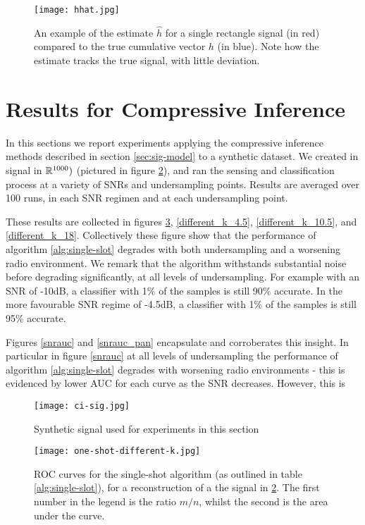 \begin{figure}[h]
\centering
\texttt{[image: hhat.jpg]}
\label{fig:hhat}
\caption{An example of the estimate \(\hat{h}\) for a single rectangle signal (in red) compared to the true cumulative vector \(h\) (in blue). Note how the estimate tracks the true signal, with little deviation.}
\end{figure}

\clearpage

\section{Results for Compressive Inference}
\label{ci-results}

In this sections we report experiments applying the compressive inference methods described in section \ref{sec:sig-model} to a synthetic dataset. We created in signal in \({\mathbb{R}}^{1000})\) (pictured in figure \ref{ci-sig}), and ran the sensing and classification process at a variety of SNRs and undersampling points. Results are averaged over 100 runs, in each SNR regimen and at each undersampling point.

These results are collected in figures \ref{different_k}, \ref{different_k_4.5}, \ref{different_k_10.5}, and \ref{different_k_18}. Collectively these figure show that the performance of algorithm \ref{alg:single-slot} degrades with both undersampling and a worsening radio environment. We remark that the algorithm withstands substantial noise before degrading significantly, at all levels of undersampling. For example with an SNR of -10dB, a classifier with 1\% of the samples is still 90\% accurate. In the more favourable SNR regime of -4.5dB, a classifier with 1\% of the samples is still 95\% accurate.

Figures \eqref{snrauc} and \eqref{snrauc_pan} encapsulate and corroberates this insight. In particular in figure \eqref{snrauc} at all levels of undersampling the performance of algorithm \ref{alg:single-slot} degrades with worsening radio environments - this is evidenced by lower AUC for each curve as the SNR decreases. However, this is 


\begin{figure}[h]
\centering
\texttt{[image: ci-sig.jpg]}
\caption{Synthetic signal used for experiments in this section}
\label{ci-sig}
\end{figure}


\begin{figure}[h]
\centering
\texttt{[image: one-shot-different-k.jpg]}
\caption{ROC curves for the single-shot algorithm (as outlined in table \ref{alg:single-slot}), for a  reconstruction of a  the signal in \ref{ci-sig}. The first number in the legend is the ratio \(m/n\), whilst the second is the area under the curve.}
\label{different_k}
\end{figure}


